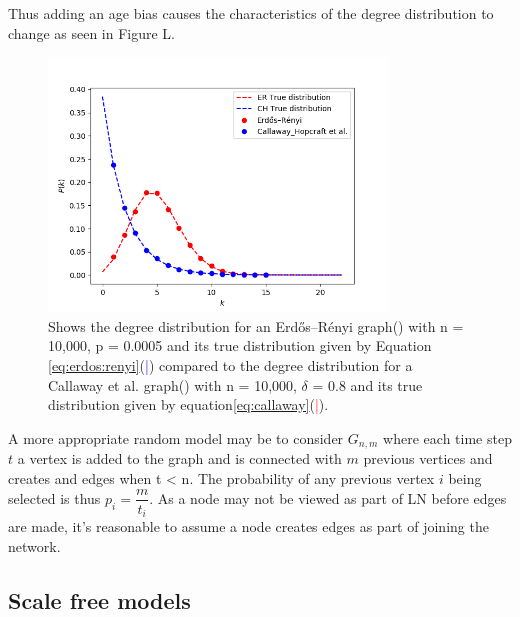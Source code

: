 Thus adding an age bias causes the characteristics of the degree distribution to change as seen in Figure L.

\begin{figure}[!htb]
		\hspace*{-0.5cm} 
	\centering
	\includegraphics[width=9cm]{images/random_topology_degree_distribution.png}
	\caption{Shows the degree distribution for an Erdős–Rényi graph(\tikzcircle[blue, fill=blue]{2pt}) with n = 10,000, p = 0.0005 and its true distribution given by Equation \ref{eq:erdos:renyi}(\textcolor{blue}{|}) compared to the degree distribution for a Callaway et al. graph(\tikzcircle[red, fill=red]{2pt})  with n = 10,000, $\delta$ = 0.8 and its true distribution given by equation\ref{eq:callaway}(\textcolor{red}{|}).
	}
	\label{fig:fee_curve}
		\hspace*{2mm} 
\end{figure}

A more appropriate random model may be to consider $G_{n,m}$ where each time step $t$ a vertex is added to the graph and is connected with $m$ previous vertices and creates and edges when t < n. The probability of any previous vertex $i$ being selected is thus $p_i = \dfrac{m}{t_i}$. 
As a node may not be viewed as part of LN before edges are made, it's reasonable to assume a node creates edges as part of joining the network.




\subsection{Scale free models}

